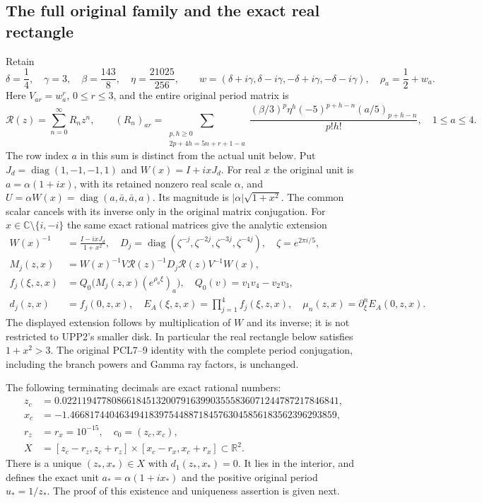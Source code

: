 \documentclass[11pt]{article}
\begin{document}
\subsection{The full original family and the exact real rectangle}
Retain
\[
 \delta=\frac14,\quad\gamma=3,\quad\beta=\frac{143}{8},
 \quad\eta=\frac{21025}{256},\qquad
 w=(\delta+i\gamma,\delta-i\gamma,-\delta+i\gamma,-\delta-i\gamma),
 \quad \rho_a=\frac12+w_a .\tag{RPZ1}
\]
Here $V_{ar}=w_a^r$, $0\le r\le3$, and the entire original period
matrix is
\[
 \mathcal R(z)=\sum_{n=0}^{\infty}R_nz^n,\qquad
 (R_n)_{ar}=\sum_{\substack{p,h\ge0\\2p+4h=5n+r+1-a}}
 \frac{(\beta/3)^p\eta^h(-5)^{p+h-n}(a/5)_{p+h-n}}{p!h!},
 \quad 1\le a\le4.\tag{RPZ2}
\]
The row index $a$ in this sum is distinct from the actual unit below.
Put $J_d=\operatorname{diag}(1,-1,-1,1)$ and $W(x)=I+ixJ_d$.
For real $x$ the original unit is $a=\alpha(1+ix)$, with its retained
nonzero real scale $\alpha$, and
$U=\alpha W(x)=\operatorname{diag}(a,\bar a,\bar a,a)$.
Its magnitude is $|\alpha|\sqrt{1+x^2}$. The common scalar cancels
with its inverse only in the original matrix conjugation.
For $x\in\mathbb C\setminus\{i,-i\}$ the same exact rational
matrices give the analytic extension
\[
 \begin{aligned}
 W(x)^{-1}&=\frac{I-ixJ_d}{1+x^2},\quad
 D_j=\operatorname{diag}(\zeta^{-j},\zeta^{-2j},\zeta^{-3j},\zeta^{-4j}),
 \quad\zeta=e^{2\pi i/5},\\
 M_j(z,x)&=W(x)^{-1}V\mathcal R(z)^{-1}D_j\mathcal R(z)V^{-1}W(x),\\
 f_j(\xi,z,x)&=Q_0\bigl(M_j(z,x)(e^{\rho_a\xi})_a\bigr),
 \quad Q_0(v)=v_1v_4-v_2v_3,\\
 d_j(z,x)&=f_j(0,z,x),\quad
 E_A(\xi,z,x)=\prod_{j=1}^4 f_j(\xi,z,x),\quad
 \mu_n(z,x)=\partial_\xi^n E_A(0,z,x).
 \end{aligned}\tag{RPZ3}
\]
The displayed extension follows by multiplication of $W$ and its
inverse; it is not restricted to UPP2's smaller disk. In particular
the real rectangle below satisfies $1+x^2>3$. The original PCL7--9
identity with the complete period conjugation, including the branch
powers and Gamma ray factors, is unchanged.

The following terminating decimals are exact rational numbers:
\[
 \begin{aligned}
 z_c&=0.02211947780866184513200791639903555836071244787217846841,\\
 x_c&=-1.466817440463494183975448871845763045856183562396293859,\\
 r_z&=r_x=10^{-15},\quad c_0=(z_c,x_c),\\
 X&=[z_c-r_z,z_c+r_z]\times[x_c-r_x,x_c+r_x]\subset\mathbb R^2 .
 \end{aligned}\tag{RPZ4}
\]
There is a unique $(z_*,x_*)\in X$ with $d_1(z_*,x_*)=0$.
It lies in the interior, and defines the exact unit
$a_*=\alpha(1+ix_*)$ and the positive original period $u_*=1/z_*$.
The proof of this existence and uniqueness assertion is given next.
\end{document}
